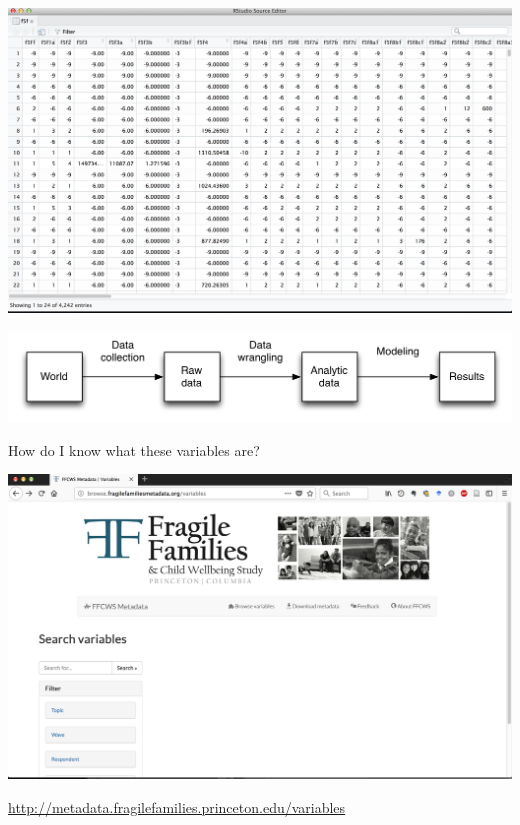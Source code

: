 \documentclass{beamer}
\begin{document}
\begin{frame}

\begin{center}
\includegraphics[width=\textwidth]{figures/ffc_rawdata_f5f}
\end{center}

\end{frame}
\begin{frame}

\begin{center}
\includegraphics[width=\textwidth]{figures/scientific_pipeline}
\end{center}

\end{frame}
\begin{frame}

How do I know what these variables are? 

\begin{center}
\includegraphics[width=\textwidth]{figures/ff_metadata_browser}
\end{center}

\vfill

\url{http://metadata.fragilefamilies.princeton.edu/variables}

\end{frame}
\end{document}

